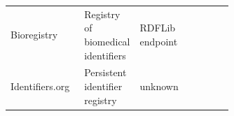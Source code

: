 \begin{table}[!t]
\begin{tabularx}{\linewidth}{
    L{0.16\linewidth}
    Y
    L{0.22\linewidth}
    L{0.25\linewidth}
}
Bioregistry~\cite{Hoyt2022Bioregistry} 
& Registry of biomedical identifiers 
& RDFLib endpoint
&  \\

Identifiers.org~\cite{Juty2012Identifiers} 
& Persistent identifier registry 
& unknown
&  \\

\hline
\end{tabularx}
\end{table}